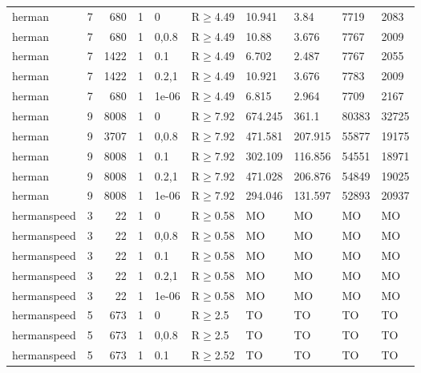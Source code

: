 \begin{longtable}{llrrllllll}
 herman        & 7        &    	680 & 1 & 0     & R$\geq$4.49  & 10.941   & 3.84     & 7719    & 2083   \\
 herman        & 7        &    	680 & 1 & 0,0.8 & R$\geq$4.49  & 10.88    & 3.676    & 7767    & 2009   \\
 herman        & 7        &   	1422 & 1 & 0.1   & R$\geq$4.49  & 6.702    & 2.487    & 7767    & 2055   \\
 herman        & 7        &   	1422 & 1 & 0.2,1 & R$\geq$4.49  & 10.921   & 3.676    & 7783    & 2009   \\
 herman        & 7        &    	680 & 1 & 1e-06 & R$\geq$4.49  & 6.815    & 2.964    & 7709    & 2167   \\
 herman        & 9        &   	8008 & 1 & 0     & R$\geq$7.92  & 674.245  & 361.1    & 80383   & 32725  \\
 herman        & 9        &   	3707 & 1 & 0,0.8 & R$\geq$7.92  & 471.581  & 207.915  & 55877   & 19175  \\
 herman        & 9        &   	8008 & 1 & 0.1   & R$\geq$7.92  & 302.109  & 116.856  & 54551   & 18971  \\
 herman        & 9        &   	8008 & 1 & 0.2,1 & R$\geq$7.92  & 471.028  & 206.876  & 54849   & 19025  \\
 herman        & 9        &   	8008 & 1 & 1e-06 & R$\geq$7.92  & 294.046  & 131.597  & 52893   & 20937  \\
 hermanspeed   & 3        &     	22 & 1 & 0     & R$\geq$0.58  & MO       & MO       & MO      & MO     \\
 hermanspeed   & 3        &     	22 & 1 & 0,0.8 & R$\geq$0.58  & MO       & MO       & MO      & MO     \\
 hermanspeed   & 3        &     	22 & 1 & 0.1   & R$\geq$0.58  & MO       & MO       & MO      & MO     \\
 hermanspeed   & 3        &     	22 & 1 & 0.2,1 & R$\geq$0.58  & MO       & MO       & MO      & MO     \\
 hermanspeed   & 3        &     	22 & 1 & 1e-06 & R$\geq$0.58  & MO       & MO       & MO      & MO     \\
 hermanspeed   & 5        &    	673 & 1 & 0     & R$\geq$2.5   & TO       & TO       & TO      & TO     \\
 hermanspeed   & 5        &    	673 & 1 & 0,0.8 & R$\geq$2.5   & TO       & TO       & TO      & TO     \\
 hermanspeed   & 5        &    	673 & 1 & 0.1   & R$\geq$2.52  & TO       & TO       & TO      & TO     \\

\end{longtable}
